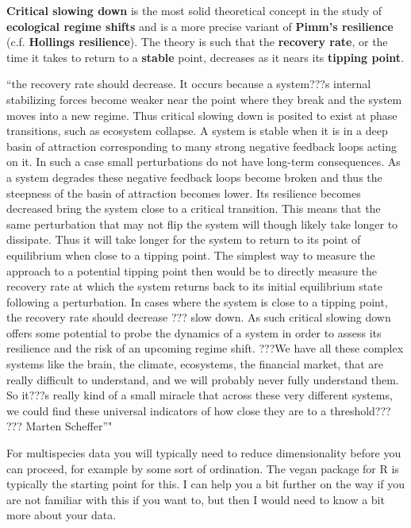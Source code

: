 \documentclass[12pt,twoside,openany]{reedthesis}
\begin{document}
\textbf{Critical slowing down} is the most solid theoretical concept in
the study of \textbf{ecological regime shifts} and is a more precise
variant of \textbf{Pimm's resilience} (c.f. \textbf{Hollings
resilience}). The theory is such that the \textbf{recovery rate}, or the
time it takes to return to a \textbf{stable} point, decreases as it
nears its \textbf{tipping point}.

``the recovery rate should decrease. It occurs because a system???s
internal stabilizing forces become weaker near the point where they
break and the system moves into a new regime. Thus critical slowing down
is posited to exist at phase transitions, such as ecosystem collapse. A
system is stable when it is in a deep basin of attraction corresponding
to many strong negative feedback loops acting on it. In such a case
small perturbations do not have long-term consequences. As a system
degrades these negative feedback loops become broken and thus the
steepness of the basin of attraction becomes lower. Its resilience
becomes decreased bring the system close to a critical transition. This
means that the same perturbation that may not flip the system will
though likely take longer to dissipate. Thus it will take longer for the
system to return to its point of equilibrium when close to a tipping
point. The simplest way to measure the approach to a potential tipping
point then would be to directly measure the recovery rate at which the
system returns back to its initial equilibrium state following a
perturbation. In cases where the system is close to a tipping point, the
recovery rate should decrease ??? slow down. As such critical slowing
down offers some potential to probe the dynamics of a system in order to
assess its resilience and the risk of an upcoming regime shift. ???We
have all these complex systems like the brain, the climate, ecosystems,
the financial market, that are really difficult to understand, and we
will probably never fully understand them. So it???s really kind of a
small miracle that across these very different systems, we could find
these universal indicators of how close they are to a threshold??? ???
Marten Scheffer''"

For multispecies data you will typically need to reduce dimensionality
before you can proceed, for example by some sort of ordination. The
vegan package for R is typically the starting point for this. I can help
you a bit further on the way if you are not familiar with this if you
want to, but then I would need to know a bit more about your data.
\end{document}
